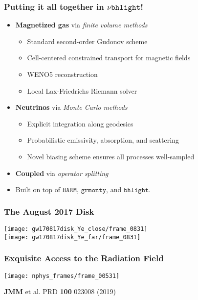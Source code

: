 \documentclass[]{beamer}
\begin{document}
\begin{frame}
  \frametitle{Putting it all together in $\nu\texttt{bhlight}$!}
  \begin{itemize}
  \item \textbf{Magnetized gas} via \textit{finite volume methods}
    \begin{itemize}
    \item Standard second-order Gudonov scheme
    \item Cell-centered constrained transport for magnetic fields
    \item WENO5 reconstruction
    \item Local Lax-Friedrichs Riemann solver
    \end{itemize}
  \item \textbf{Neutrinos} via \textit{Monte Carlo methods}
    \begin{itemize}
    \item Explicit integration along geodesics
    \item Probabilistic emissivity, absorption, and scattering
    \item Novel biasing scheme ensures all processes well-sampled
    \end{itemize}
  \item \textbf{Coupled} via \textit{operator splitting}
  \item Built on top of $\texttt{HARM}$, $\texttt{grmonty}$, and
    $\texttt{bhlight}$.
  \end{itemize}
\end{frame}

\begin{frame}
  \frametitle{The August 2017 Disk}
  \begin{center}
    \texttt{[image: gw170817disk\_Ye\_close/frame\_0831]} \\
    \texttt{[image: gw170817disk\_Ye\_far/frame\_0831]} 
  \end{center}
\end{frame}

\begin{frame}
  \frametitle{Exquisite Access to the Radiation Field}
  \begin{center}
    \texttt{[image: nphys\_frames/frame\_00531]}
  \end{center}
  \begin{tiny}
    \textbf{JMM} et al. PRD \textbf{100} 023008 (2019)
  \end{tiny}
\end{frame}
\end{document}
